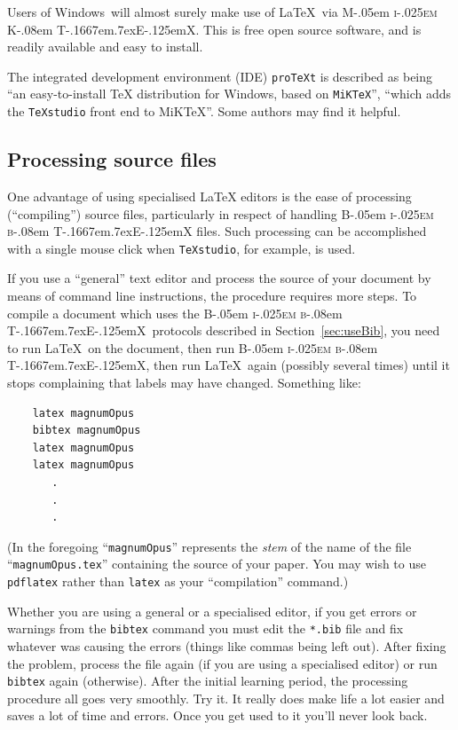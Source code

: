 \documentclass[times, doublespace]{anzsauth}
\newcommand\BibTeX{{\rmfamily B\kern-.05em \textsc{i\kern-.025em b}\kern-.08em
T\kern-.1667em\lower.7ex\hbox{E}\kern-.125emX}}
\newcommand\MiKTeX{{\rmfamily M\kern-.05em \textsc{i\kern-.025em K}\kern-.08em
T\kern-.1667em\lower.7ex\hbox{E}\kern-.125emX}}
\begin{document}
Users of Windows\texttrademark\ will almost surely make use of
\LaTeX\ via \MiKTeX.  This is free open source software, and is
readily available and easy to install.

The integrated development environment (IDE) \texttt{proTeXt} is
described as being ``an easy-to-install \TeX{} distribution for
Windows\texttrademark, based on \texttt{MiKTeX}'', ``which adds
the \texttt{TeXstudio} front end to MiKTeX''.  Some authors may
find it helpful.

\subsection{Processing source files}
\label{sec:procBib}

One advantage of using specialised \LaTeX{} editors is the ease of
processing (``compiling'') source files, particularly in respect of
handling \BibTeX{} files. Such processing can be accomplished with
a single mouse click when \texttt{TeXstudio}, for example, is used.

If you use a ``general'' text editor and process the source
of your document by means of command line instructions, the procedure
requires more steps.  To compile a document which uses the \BibTeX\
protocols described in Section~\ref{sec:useBib}, you need to run
\LaTeX\ on the document, then run \BibTeX, then run \LaTeX\ again
(possibly several times) until it stops complaining that labels
may have changed.  Something like:
\begin{verbatim}
    latex magnumOpus
    bibtex magnumOpus
    latex magnumOpus
    latex magnumOpus
       .
       .
       .
\end{verbatim}
(In the foregoing ``\texttt{magnumOpus}'' represents the \emph{stem}
of the name of the file ``\texttt{magnumOpus.tex}'' containing
the source of your paper.  You may wish to use \texttt{pdflatex}
rather than \texttt{latex} as your ``compilation'' command.)

Whether you are using a general or a specialised editor, if you get
errors or warnings from the \texttt{bibtex} command you must edit
the \texttt{*.bib} file and fix whatever was causing the errors
(things like commas being left out).  After fixing the problem,
process the file again (if you are using a specialised editor)
or run \texttt{bibtex} again (otherwise).  After the initial
learning period, the processing procedure all goes very smoothly.
Try it. It really does make life a lot easier and saves a lot of
time and errors. Once you get used to it you'll never look back.
\end{document}
